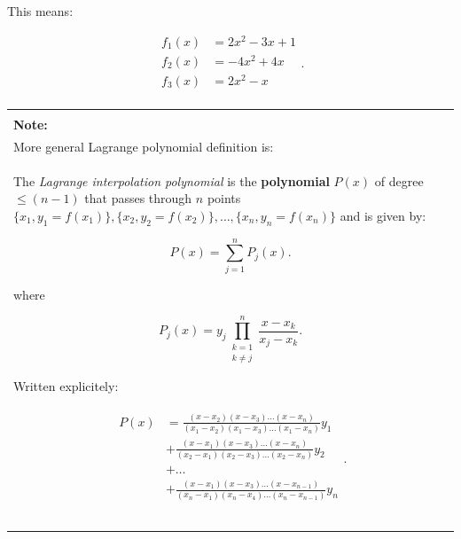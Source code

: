 \documentclass[10pt,b5paper,titlepage]{book}
\newenvironment{bbox}[1][1.0]
{
    \begin{center}
        \begin{tabular}{|p{#1\textwidth}|}
            \hline\\
}
{
            \\\\\hline
        \end{tabular}
    \end{center}
}
\begin{document}
This means:

\begin{equation}
    \begin{array}{ll}
        f_{1}(x) &= 2 x^{2} - 3 x + 1 \\
        f_{2}(x) &= -4 x^{2} + 4 x \\
        f_{3}(x) &= 2 x^{2} - x \\
    \end{array}
.\end{equation}

\begin{bbox}
    \textbf{Note:}\\

    More general Lagrange polynomial definition is: \\

    The \textit{Lagrange interpolation polynomial} is the \textbf{polynomial}
    $P(x)$ of degree $\leq (n - 1)$ that passes through $n$ points
$\{x_1, y_1 = f(x_1)\}, \{x_2, y_2 = f(x_2)\}, \ldots, \{x_{n}, y_{n} = f(x_{n})\}$
    and is given by:

    \begin{equation}
        P(x) = \sum_{j=1}^{n} P_{j}(x)
    .\end{equation}

    where

    \begin{equation}
        P_{j}(x) = y_{j} \prod_{\begin{array}{ll}
             k = 1 \\
             k \neq j
        \end{array}}^{n} \frac{x - x_{k}}{x_{j} - x_{k}}
    .\end{equation}

    Written explicitely:

    \begin{eqnarray}
        \begin{split}
            P(x)
            &= \frac{(x - x_2)(x - x_3)\ldots(x - x_{n})}
            {(x_1 - x_2)(x_1 - x_3)\ldots(x_1 - x_{n})} y_1 \\
            &+ \frac{(x - x_1)(x - x_3)\ldots(x - x_{n})}
            {(x_2 - x_1)(x_2 - x_3)\ldots(x_2 - x_{n})} y_2 \\
            &+ \ldots \\
            &+ \frac{(x - x_1)(x - x_3)\ldots(x - x_{n-1})}
            {(x_{n} - x_1)(x_{n} - x_4)\ldots(x_{n} - x_{n-1})} y_{n} \\
        \end{split}
    .\end{eqnarray}
\end{bbox}
\end{document}

